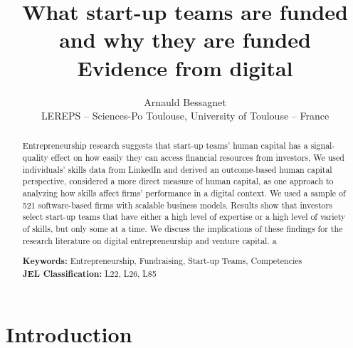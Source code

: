 \documentclass[12pt]{article}
\begin{document}
\title{What start-up teams are funded and why they are funded \\ Evidence from digital }
\date{\vspace{-3ex}}
\author{Arnauld Bessagnet \\ \footnotesize{LEREPS – Sciences-Po Toulouse, University of Toulouse – France} \\}

\maketitle \vspace{-1,5em}

\begin{abstract}
\noindent
Entrepreneurship research suggests that start-up teams' human capital has a signal-quality effect on how easily they can access financial resources from investors. We used individuals' skills data from LinkedIn and derived an outcome-based human capital perspective, considered a more direct measure of human capital, as one approach to analyzing how skills affect firms’ performance in a digital context. We used a sample of 521 software-based firms with scalable business models. Results show that investors select start-up teams that have either a high level of expertise or a high level of variety of skills, but only some at a time. We discuss the implications of these findings for the research literature on digital entrepreneurship and venture capital. a\newline

\begin{obeylines}
\noindent \footnotesize{}{\textbf{Keywords:} Entrepreneurship, Fundraising, Start-up Teams, Competencies}
\noindent \footnotesize{\textbf{JEL Classification:} L22, L26, L85}
\end{obeylines}

\end{abstract}

\clearpage
\section{Introduction}
\end{document}
